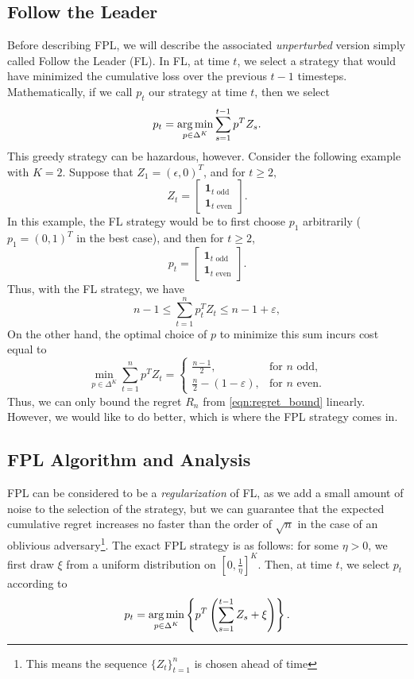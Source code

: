 \subsection{Follow the Leader}
Before describing FPL, we will describe the associated \emph{unperturbed} version simply called Follow the Leader (FL). In FL, at time $t$, we select a strategy that would have minimized the cumulative loss over the previous $t-1$ timesteps. Mathematically, if we call $p_t$ our strategy at time $t$, then we select
\[
p_t = \operatorname*{arg\,min}_{p \in \Delta^K} \sum_{s=1}^{t-1} p^T Z_s.
\]
This greedy strategy can be hazardous, however. Consider the following example with $K = 2$. Suppose that $Z_1 = (\epsilon, 0)^T$, and for $t \geq 2,$
\[
Z_t = \begin{bmatrix}
\mathbf{1}_{t \text{ odd}} \\
\mathbf{1}_{t \text{ even}}
\end{bmatrix}.
\]
In this example, the FL strategy would be to first choose $p_1$ arbitrarily ($p_1 = (0, 1)^T$ in the best case), and then for $t \geq 2$,
\[
p_t = \begin{bmatrix}
\mathbf{1}_{t \text{ odd}} \\
\mathbf{1}_{t \text{ even}}
\end{bmatrix}.
\]
Thus, with the FL strategy, we have
\[
n - 1 \leq \sum_{t=1}^n p_t^T Z_t \leq n - 1 + \varepsilon,
\]
On the other hand, the optimal choice of $p$ to minimize this sum incurs cost equal to
\[
  \min_{p \in \Delta^K} \sum_{t=1}^n p^T Z_t =
  \begin{cases}
    \frac{n-1}{2}, & \text{for $n$ odd}, \\
    \frac{n}{2} - (1 - \varepsilon), & \text{for $n$ even}.
  \end{cases}
\]
Thus, we can only bound the regret $R_n$ from \eqref{eqn:regret_bound} linearly. However, we would like to do better, which is where the FPL strategy comes in.

\subsection{FPL Algorithm and Analysis}
FPL can be considered to be a \emph{regularization} of FL, as we add a small amount of noise to the selection of the strategy, but we can guarantee that the expected cumulative regret increases no faster than the order of $\sqrt{n}$ in the case of an oblivious adversary\footnote{This means the sequence $\{Z_t\}_{t=1}^n$ is chosen ahead of time}. The exact FPL strategy is as follows: for some $\eta > 0$, we first draw $\xi$ from a uniform distribution on $[0, \frac{1}{\eta}]^K$. Then, at time $t$, we select $p_t$ according to
\begin{equation} \label{eqn:FPL}
p_t = \operatorname*{arg\,min}_{p \in \Delta^K} \left\{p^T \left( \sum_{s = 1}^{t-1} Z_s + \xi\right) \right\}.
\end{equation}

